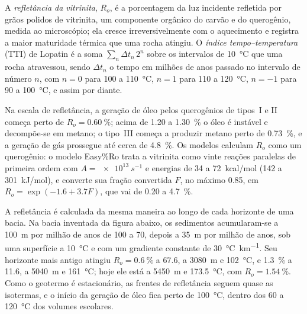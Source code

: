 \begin{definition}\label{def:b2:energy-geology:maturity}
A \emph{refletância da vitrinita}, $R_o$, é a porcentagem da luz
incidente refletida por grãos polidos de vitrinita, um componente orgânico do carvão e do querogênio,
medida ao microscópio; ela cresce irreversivelmente com o aquecimento e registra a maior maturidade térmica que uma rocha atingiu. O
\emph{índice tempo--temperatura} (TTI) de Lopatin é a soma
$\sum_n \Delta t_n\,2^n$ sobre os intervalos de \qty{10}{\celsius} que uma rocha atravessou,
sendo $\Delta t_n$ o tempo em milhões de anos passado no intervalo de número $n$, com $n = 0$
para 100 a \qty{110}{\celsius}, $n = 1$ para 110 a \qty{120}{\celsius}, $n = -1$ para 90 a
\qty{100}{\celsius}, e assim por diante.
\end{definition}

Na escala de refletância, a geração de óleo pelos querogênios de tipos~I e II começa perto de $R_o =
\qty{0.60}{\percent}$; acima de 1.20 a \qty{1.30}{\percent} o óleo é instável e decompõe-se em
metano; o tipo~III começa a produzir metano perto de \qty{0.73}{\percent}, e a geração de gás prossegue até
cerca de \qty{4.8}{\percent}. Os modelos calculam $R_o$ como um querogênio: o modelo Easy\%Ro
trata a vitrinita como vinte reações paralelas de primeira ordem com $A = \qty{e13}{s^{-1}}$ e energias
de 34 a \qty{72}{kcal/mol} (142 a \qty{301}{kJ/mol}), e converte sua fração convertida $F$,
no máximo 0.85, em $R_o = \exp(-1.6 + 3.7F)$, que vai de 0.20 a \qty{4.7}{\percent}.

A refletância é calculada da mesma maneira ao longo de cada horizonte de uma bacia. Na bacia inventada da
figura abaixo, os sedimentos acumularam-se a \qty{100}{m} por milhão de anos de 100 a \qty{70}{\Ma},
depois a \qty{35}{m} por milhão de anos, sob uma superfície a \qty{10}{\celsius} e com um gradiente constante
de \qty{30}{\celsius\per\km}. Seu horizonte mais antigo atingiu $R_o = \qty{0.6}{\percent}$ a
\qty{67.6}{\Ma}, a \qty{3080}{m} e \qty{102}{\celsius}, e \qty{1.3}{\percent} a
\qty{11.6}{\Ma}, a \qty{5040}{m} e \qty{161}{\celsius}; hoje ele está a \qty{5450}{m} e
\qty{173.5}{\celsius}, com $R_o = \qty{1.54}{\percent}$. Como o geotermo é estacionário, as
frentes de refletância seguem quase as isotermas, e o início da geração de óleo fica perto de
\qty{100}{\celsius}, dentro dos 60 a \qty{120}{\celsius} dos volumes escolares.

